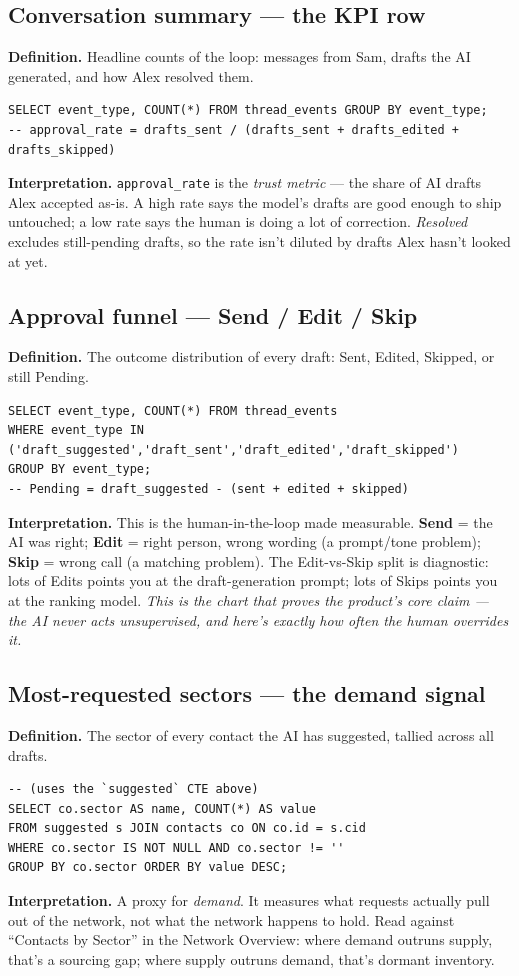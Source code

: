 \documentclass[11pt, a4paper]{article}
\begin{document}
\subsection{Conversation summary --- the KPI row}
\textbf{Definition.} Headline counts of the loop: messages from Sam, drafts the AI generated, and how Alex resolved them.
\begin{lstlisting}[style=sql]
SELECT event_type, COUNT(*) FROM thread_events GROUP BY event_type;
-- approval_rate = drafts_sent / (drafts_sent + drafts_edited + drafts_skipped)
\end{lstlisting}
\textbf{Interpretation.} \texttt{approval\_rate} is the \emph{trust metric} --- the share of AI drafts Alex accepted as-is. A high rate says the model's drafts are good enough to ship untouched; a low rate says the human is doing a lot of correction. \emph{Resolved} excludes still-pending drafts, so the rate isn't diluted by drafts Alex hasn't looked at yet.

\subsection{Approval funnel --- Send / Edit / Skip}
\textbf{Definition.} The outcome distribution of every draft: Sent, Edited, Skipped, or still Pending.
\begin{lstlisting}[style=sql]
SELECT event_type, COUNT(*) FROM thread_events
WHERE event_type IN ('draft_suggested','draft_sent','draft_edited','draft_skipped')
GROUP BY event_type;
-- Pending = draft_suggested - (sent + edited + skipped)
\end{lstlisting}
\textbf{Interpretation.} This is the human-in-the-loop made measurable. \textbf{Send} = the AI was right; \textbf{Edit} = right person, wrong wording (a prompt/tone problem); \textbf{Skip} = wrong call (a matching problem). The Edit-vs-Skip split is diagnostic: lots of Edits points you at the draft-generation prompt; lots of Skips points you at the ranking model. \emph{This is the chart that proves the product's core claim --- the AI never acts unsupervised, and here's exactly how often the human overrides it.}

\subsection{Most-requested sectors --- the demand signal}
\textbf{Definition.} The sector of every contact the AI has suggested, tallied across all drafts.
\begin{lstlisting}[style=sql]
-- (uses the `suggested` CTE above)
SELECT co.sector AS name, COUNT(*) AS value
FROM suggested s JOIN contacts co ON co.id = s.cid
WHERE co.sector IS NOT NULL AND co.sector != ''
GROUP BY co.sector ORDER BY value DESC;
\end{lstlisting}
\textbf{Interpretation.} A proxy for \emph{demand}. It measures what requests actually pull out of the network, not what the network happens to hold. Read against ``Contacts by Sector'' in the Network Overview: where demand outruns supply, that's a sourcing gap; where supply outruns demand, that's dormant inventory.
\end{document}
